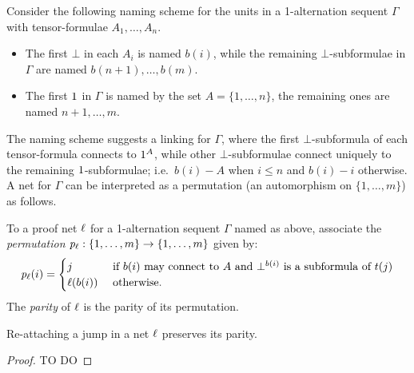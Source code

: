 Consider the following naming scheme for the units in a 1-alternation sequent $\Gamma$ with tensor-formulae $A_1,\dotsc,A_n$.
%
\begin{itemize}

	\item
The first $\bot$ in each $A_i$ is named $b(i)$, while the remaining $\bot$-subformulae in $\Gamma$ are named $b(n+1),\dotsc,b(m)$.

	\item
The first $1$ in $\Gamma$ is named by the set $A=\{1,\dotsc,n\}$, the remaining ones are named $n+1,\dotsc,m$.

\end{itemize}
%
The naming scheme suggests a linking for $\Gamma$, where the first $\bot$-subformula of each tensor-formula connects to $1^{A}$, while other $\bot$-subformulae connect uniquely to the remaining $1$-subformulae; i.e.\ $b(i)-A$ when $i\leq n$ and $b(i)-i$ otherwise.
%
A net for $\Gamma$ can be interpreted as a permutation (an automorphism on $\{1,\dotsc,m\}$) as follows.
%
\begin{definition}
To a proof net $\ell$ for a 1-alternation sequent $\Gamma$ named as above, associate the \emph{permutation} $\mathit p_{\ell}:\{1,\dotsc,m\}\to\{1,\dotsc,m\}$ given by:
\[
	\mathit p_{\ell}(i) = 
	\begin{cases}
		j 				& \text{ if $b(i)$ may connect to $A$ and $\bot^{b(i)}$ is a subformula of $t(j)$}
	\\	\ell(b(i))	& \text{ otherwise.}
	\end{cases}
\]
The \emph{parity} of $\ell$ is the parity of its permutation.
\end{definition}



\begin{proposition}
\label{lem:level0 min binary}
Re-attaching a jump in a net $\ell$ preserves its parity. 
\end{proposition}


\begin{proof}
TO DO
\end{proof}















